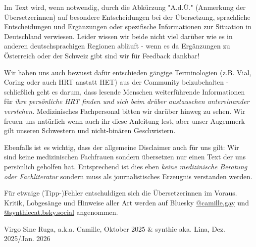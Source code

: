 \documentclass{article}
\begin{document}
Im Text wird, wenn notwendig, durch die Abkürzung "A.d.Ü." (Anmerkung der Übersetzerinnen) auf besondere Entscheidungen bei der Übersetzung, sprachliche Entscheidungen und Ergänzungen oder spezifische Informationen zur Situation in Deutschland verwiesen. Leider wissen wir beide nicht viel darüber wie es in anderen deutschsprachigen Regionen abläuft - wenn es da Ergänzungen zu Österreich oder der Schweiz gibt sind wir für Feedback dankbar!

Wir haben uns auch bewusst dafür entschieden gängige Terminologien (z.B. Vial, Coring oder auch HRT anstatt HET) aus der Community beizubehalten - schließlich geht es darum, dass lesende Menschen weiterführende Informationen für \textit{ihre persönliche HRT finden und sich beim drüber austauschen untereinander verstehen.} Medizinisches Fachpersonal bitten wir darüber hinweg zu sehen. Wir freuen uns natürlich wenn auch ihr diese Anleitung lest, aber unser Augenmerk gilt unseren Schwestern und nicht-binären Geschwistern. 

Ebenfalls ist es wichtig, dass der allgemeine Disclaimer auch für uns gilt: Wir sind keine medizinischen Fachfrauen sondern übersetzen nur einen Text der uns persönlich geholfen hat. Entsprechend ist dies eben \textit{keine medizinische Beratung oder Fachliteratur} sondern muss als journalistisches Erzeugnis verstanden werden.

Für etwaige (Tipp-)Fehler entschuldigen sich die Übersetzerinnen im Voraus. Kritik, Lobgesänge und Hinweise aller Art werden auf Bluesky \href{https://bsky.app/profile/camille.gay}{@camille.gay} und \href{https://bsky.app/profile/synthiecat.bsky.social}{@synthiecat.bsky.social} angenommen.

Virgo Sine Ruga, a.k.a. Camille, Oktober 2025 \& synthie aka. Lina, Dez. 2025/Jan. 2026
\end{document}
